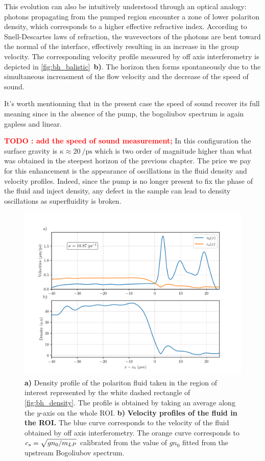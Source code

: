 This evolution can also be intuitively understood through an optical analogy: photons propagating from the pumped region encounter a zone of lower polariton density, which corresponds to a higher effective refractive index. According to Snell-Descartes laws of refraction, the wavevectors of the photons are bent toward the normal of the interface, effectively resulting in an increase in the group velocity. 
The corresponding velocity profile measured by off axis interferometry is depicted in \autoref{fig:bh_balistic}~\textbf{b)}.  The horizon then forms
spontaneously due to the simultaneous increasment of the flow velocity and the decrease of the speed of sound.

\bigskip

It's worth mentionning that in the present case the speed of sound recover its full meaning since in the absence of the pump, the bogoliubov spectrum 
is again gapless and linear.

\textcolor{red}{\textbf{TODO : add the speed of sound measurement;}}
In this configuration the surface gravity is $\kappa\approx \SI{20}{\per \pico \second}$ which is two order of magnitude higher than what was obtained 
in the steepest horizon of the previous chapter. The price we pay for this enhancement is the appearance of oscillations in the fluid density and velocity profiles.
Indeed, since the pump is no longer present to fix the phase of the fluid and inject density, any defect in the sample can lead to density oscillations as superfluidity is broken.


\begin{figure}
    \centering
    \includegraphics[width=1\textwidth]{chap_stimulated_hawking/fig/bh_balistic.pdf}
    \caption{\textbf{a)} Density profile of the polariton fluid taken in the region of interest represented by the white dashed rectangle of \autoref{fig:bh_density}. The profile is obtained by taking an
    average along the $y$-axis on the whole ROI. \textbf{b)} \textbf{Velocity profiles of the fluid in the ROI.} The blue curve corresponds to the velocity of the fluid obtained by off axis interferometry. The orange
    curve corresponds to $c_s=\sqrt{gn_0/m_{LP}}$ calibrated from the value of $gn_0$ fitted from the upstream Bogoliubov spectrum.}
    \label{fig:bh_balistic}
\end{figure}

